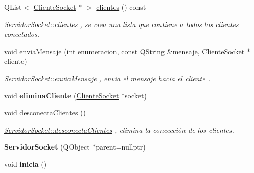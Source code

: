 \begin{DoxyCompactItemize}
Q\+List$<$ \hyperlink{class_cliente_socket}{Cliente\+Socket} $\ast$ $>$ \hyperlink{class_servidor_socket_a9ed6f48ebb85a3aade45043a5a7960d4}{clientes} () const
\begin{DoxyCompactList}\small\item\em \hyperlink{class_servidor_socket_a9ed6f48ebb85a3aade45043a5a7960d4}{Servidor\+Socket\+::clientes} , se crea una lista que contiene a todos los clientes conectados. \end{DoxyCompactList}\item 
void \hyperlink{class_servidor_socket_ae6a3796c4a79a64e667268080716d056}{envia\+Mensaje} (int enumeracion, const Q\+String \&mensaje, \hyperlink{class_cliente_socket}{Cliente\+Socket} $\ast$cliente)
\begin{DoxyCompactList}\small\item\em \hyperlink{class_servidor_socket_ae6a3796c4a79a64e667268080716d056}{Servidor\+Socket\+::envia\+Mensaje} , envia el mensaje hacia el cliente . \end{DoxyCompactList}\item 
\mbox{\label{class_servidor_socket_a6e7e13a58e360f8811c2802e2a9c6883}} 
void {\bfseries elimina\+Cliente} (\hyperlink{class_cliente_socket}{Cliente\+Socket} $\ast$socket)
\item 
\mbox{\label{class_servidor_socket_aa80657a78d484a51a9c470232960412b}} 
void \hyperlink{class_servidor_socket_aa80657a78d484a51a9c470232960412b}{desconecta\+Clientes} ()
\begin{DoxyCompactList}\small\item\em \hyperlink{class_servidor_socket_aa80657a78d484a51a9c470232960412b}{Servidor\+Socket\+::desconecta\+Clientes} , elimina la concección de los clientes. \end{DoxyCompactList}\item 
\mbox{\label{class_servidor_socket_a2c985a3cb60dbf2fa923060a99d1e06d}} 
{\bfseries Servidor\+Socket} (Q\+Object $\ast$parent=nullptr)
\item 
\mbox{\label{class_servidor_socket_a23cd19f7c5a14ed1a19ae3ddcc0cd08f}} 
void {\bfseries inicia} ()
\item 
\mbox{\label{class_servidor_socket_a331c56c842d1b9a4150ec439fef6431d}} 

\end{DoxyCompactItemize}
